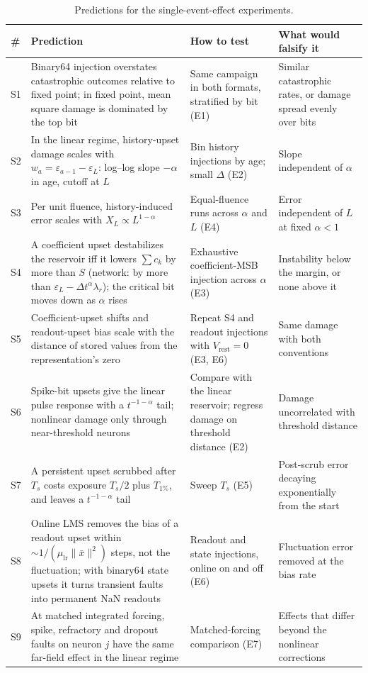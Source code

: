 \documentclass[11pt,a4paper]{article}
\newcommand{\dta}{\Delta t^{\alpha}}
\begin{document}
\begin{table}[h]
\centering
\small
\begin{tabularx}{\textwidth}{@{}l>{\raggedright\arraybackslash}X>{\raggedright\arraybackslash}X>{\raggedright\arraybackslash}X@{}}
\toprule
\# & Prediction & How to test & What would falsify it \\
\midrule
S1 & Binary64 injection overstates catastrophic outcomes relative to fixed point; in fixed point, mean square damage is dominated by the top bit & Same campaign in both formats, stratified by bit (E1) & Similar catastrophic rates, or damage spread evenly over bits \\
S2 & In the linear regime, history-upset damage scales with $w_a = \varepsilon_{a-1}-\varepsilon_L$: log--log slope $-\alpha$ in age, cutoff at $L$ & Bin history injections by age; small $\Delta$ (E2) & Slope independent of $\alpha$ \\
S3 & Per unit fluence, history-induced error scales with $X_L \propto L^{1-\alpha}$ & Equal-fluence runs across $\alpha$ and $L$ (E4) & Error independent of $L$ at fixed $\alpha<1$ \\
S4 & A coefficient upset destabilizes the reservoir iff it lowers $\sum c_k$ by more than $S$ (network: by more than $\varepsilon_L - \dta\lambda_r$); the critical bit moves down as $\alpha$ rises & Exhaustive coefficient-MSB injection across $\alpha$ (E3) & Instability below the margin, or none above it \\
S5 & Coefficient-upset shifts and readout-upset bias scale with the distance of stored values from the representation's zero & Repeat S4 and readout injections with $V_{\mathrm{rest}} = 0$ (E3, E6) & Same damage with both conventions \\
S6 & Spike-bit upsets give the linear pulse response with a $t^{-1-\alpha}$ tail; nonlinear damage only through near-threshold neurons & Compare with the linear reservoir; regress damage on threshold distance (E2) & Damage uncorrelated with threshold distance \\
S7 & A persistent upset scrubbed after $T_s$ costs exposure $T_s/2$ plus $T_{1\%}$, and leaves a $t^{-1-\alpha}$ tail & Sweep $T_s$ (E5) & Post-scrub error decaying exponentially from the start \\
S8 & Online LMS removes the bias of a readout upset within $\sim 1/(\mu_{\mathrm{lr}}\|\bar x\|^2)$ steps, not the fluctuation; with binary64 state upsets it turns transient faults into permanent NaN readouts & Readout and state injections, online on and off (E6) & Fluctuation error removed at the bias rate \\
S9 & At matched integrated forcing, spike, refractory and dropout faults on neuron $j$ have the same far-field effect in the linear regime & Matched-forcing comparison (E7) & Effects that differ beyond the nonlinear corrections \\
\bottomrule
\end{tabularx}
\caption{Predictions for the single-event-effect experiments.}
\label{tab:predictions}
\end{table}
\end{document}
